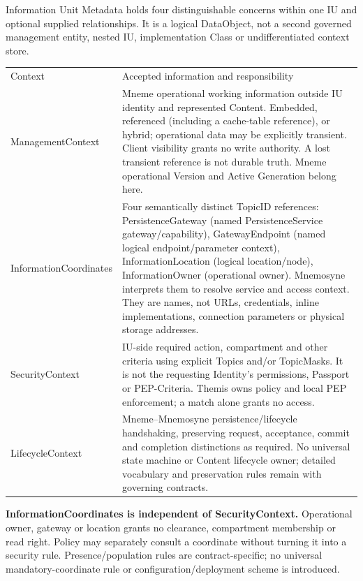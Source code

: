 Information Unit Metadata holds four distinguishable concerns within one IU and
optional supplied relationships. It is a logical DataObject, not a second governed
management entity, nested IU, implementation Class or undifferentiated context store.



\begin{longtable}{>{\raggedright\arraybackslash}p{}>{\raggedright\arraybackslash}p{}}
Context & Accepted information and responsibility \\
ManagementContext & Mneme operational working information outside IU identity and represented Content. Embedded, referenced (including a cache-table reference), or hybrid; operational data may be explicitly transient. Client visibility grants no write authority. A lost transient reference is not durable truth. Mneme operational Version and Active Generation belong here. \\
InformationCoordinates & Four semantically distinct TopicID references: PersistenceGateway (named PersistenceService gateway/capability), GatewayEndpoint (named logical endpoint/parameter context), InformationLocation (logical location/node), InformationOwner (operational owner). Mnemosyne interprets them to resolve service and access context. They are names, not URLs, credentials, inline implementations, connection parameters or physical storage addresses. \\
SecurityContext & IU-side required action, compartment and other criteria using explicit Topics and/or TopicMasks. It is not the requesting Identity's permissions, Passport or PEP-Criteria. Themis owns policy and local PEP enforcement; a match alone grants no access. \\
LifecycleContext & Mneme–Mnemosyne persistence/lifecycle handshaking, preserving request, acceptance, commit and completion distinctions as required. No universal state machine or Content lifecycle owner; detailed vocabulary and preservation rules remain with governing contracts. \\
\end{longtable}


\textbf{InformationCoordinates is independent of SecurityContext.} Operational owner,
gateway or location grants no clearance, compartment membership or read right.
Policy may separately consult a coordinate without turning it into a security rule.
Presence/population rules are contract-specific; no universal mandatory-coordinate
rule or configuration/deployment scheme is introduced.



